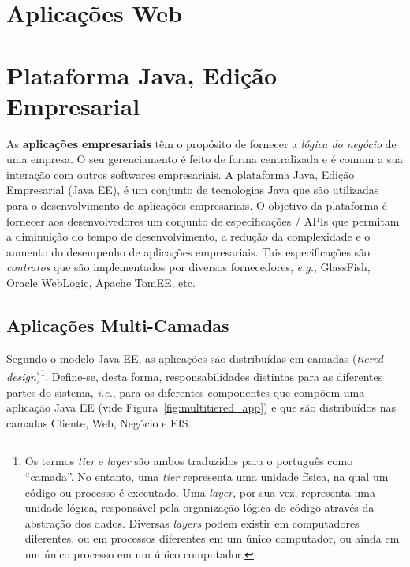 \documentclass[
  10.5pt,				  %
	openright,			%
	twoside,			  %
  a5paper,
  chapter=TITLE,	%
	section=TITLE,	%
  hyphens,        %
	english,        %
	brazil          %
]{abntex2}
\begin{document}
\section{Aplicações Web}


\section{Plataforma Java, Edição Empresarial}\label{sec:java2e}

As \textbf{aplicações empresariais} têm o propósito de fornecer a \emph{lógica do negócio} de uma empresa. O seu gerenciamento é feito de forma centralizada e é comum a sua interação com outros softwares empresariais. A plataforma Java, Edição Empresarial (Java EE), é um conjunto de tecnologias Java que são utilizadas para o desenvolvimento de aplicações empresariais. O objetivo da plataforma é fornecer aos desenvolvedores um conjunto de especificações / APIs que permitam a diminuição do tempo de desenvolvimento, a redução da complexidade e o aumento do desempenho de aplicações empresariais\cite{javaee7}. Tais especificações são \emph{contratos} que são implementados por diversos fornecedores, \emph{e.g.}, GlassFish, Oracle WebLogic, Apache TomEE, etc.

\subsection{Aplicações Multi-Camadas}

Segundo o modelo Java EE, as aplicações são distribuídas em camadas (\emph{tiered design})\footnote{Os termos \emph{tier} e \emph{layer} são ambos traduzidos para o português como ``camada''. No entanto, uma \emph{tier} representa uma unidade física, na qual um código ou processo é executado. Uma \emph{layer}, por sua vez, representa uma unidade lógica, responsável pela organização lógica do código através da abstração dos dados. Diversas \emph{layers} podem existir em computadores diferentes, ou em processos diferentes em um único computador, ou ainda em um único processo em um único computador.\cite{lhotka}}. Define-se, desta forma, responsabilidades distintas para as diferentes partes do sistema, \emph{i.e.}, para os diferentes componentes que compõem uma aplicação Java EE (vide Figura~\ref{fig:multitiered_app}) e que são distribuídos nas camadas Cliente, Web, Negócio e EIS.
\end{document}
